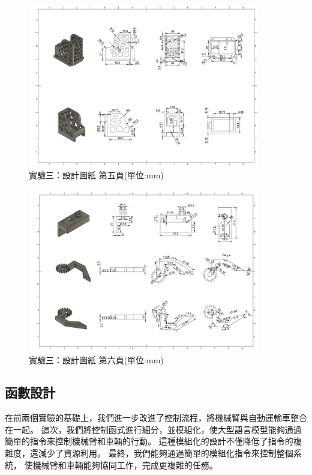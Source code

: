 \documentclass[class=NCU_thesis, crop=false]{standalone}
\begin{document}
\begin{figure}[htbp]
    \centering
    \includegraphics[width=0.9\textwidth]{figures/Armv3 (5).PNG}
    \caption{實驗三：設計圖紙 第五頁(單位:mm)}
\end{figure}

\begin{figure}[htbp]
    \centering
    \includegraphics[width=0.9\textwidth]{figures/Armv3 (6).PNG}
    \caption{實驗三：設計圖紙 第六頁(單位:mm)}
\end{figure}

\subsection{函數設計}
在前兩個實驗的基礎上，我們進一步改進了控制流程，將機械臂與自動運輸車整合在一起。
這次，我們將控制函式進行細分，並模組化，使大型語言模型能夠通過簡單的指令來控制機械臂和車輛的行動。
這種模組化的設計不僅降低了指令的複雜度，還減少了資源利用。
最終，我們能夠通過簡單的模組化指令來控制整個系統，
使機械臂和車輛能夠協同工作，完成更複雜的任務。
\end{document}
